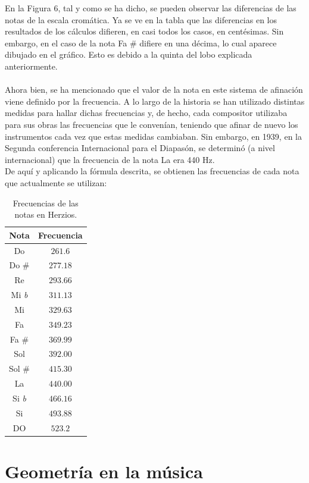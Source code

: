 \documentclass[a4paper, openright, 11pt, titlepage]{report}
\theoremstyle{definition}\newtheorem{defin}[propo]{Definition}
\theoremstyle{definition}\newtheorem{obser}[propo]{Remark}
\theoremstyle{definition}\newtheorem{ejem}[propo]{Ejemplo}
\theoremstyle{definition}\newtheorem{algoritmo}[propo]{Algoritmo}
\begin{document}
En la Figura 6, tal y como se ha dicho, se pueden observar las diferencias de las notas de la escala cromática. Ya se ve en la tabla que las diferencias en los resultados de los cálculos difieren, en casi todos los casos, en centésimas. Sin embargo, en el caso de la nota Fa \# difiere en una décima, lo cual aparece dibujado en el gráfico. Esto es debido a la quinta del lobo explicada anteriormente. \\\\
Ahora bien, se ha mencionado que el valor de la nota en este sistema de afinación viene definido por la frecuencia. A lo largo de la historia se han utilizado distintas medidas para hallar dichas frecuencias y, de hecho, cada compositor utilizaba para sus obras las frecuencias que le convenían, teniendo que afinar de nuevo los instrumentos cada vez que estas medidas cambiaban. Sin embargo, en 1939, en la Segunda conferencia Internacional para el Diapasón, se determinó (a nivel internacional) que la frecuencia de la nota La era 440 Hz.\\
De aquí y aplicando la fórmula descrita, se obtienen las frecuencias de cada nota que actualmente se utilizan:
\begin{table}[H]
    \centering
    \begin{tabular}{|c|c|}
    \hline
    Nota & Frecuencia\\
    \hline \hline
       Do & $261.6$\\
       Do \# & $277.18$\\
       Re & $293.66$\\
       Mi \textit{b} & $311.13$\\
       Mi & $329.63$\\
       Fa & $349.23$\\
       Fa \# & $369.99$\\
       Sol & $392.00$\\
       Sol \# & $415.30$\\
       La & $440.00$\\
       Si \textit{b} & $466.16$\\
       Si & $493.88$\\
       DO & $523.2$\\
       \hline
    \end{tabular}
    \caption{Frecuencias de las notas en Herzios.}
\end{table}

\chapter{Geometría en la música}
\end{document}
